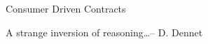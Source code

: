 \begin{frame}{Consumer Driven Contracts}
    \begin{shadequote}
        \hspace{.5cm}
        A strange inversion of reasoning\ldots -- D. Dennet
    \end{shadequote}
    \textit{}

\end{frame}
